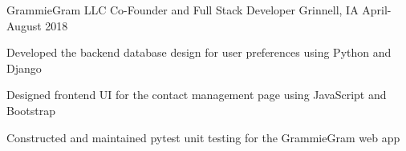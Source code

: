 \documentclass[11pt, a4paper]{awesome-cv}
\begin{document}
\begin{cventries}




  \cventry
    {GrammieGram LLC}
    {Co-Founder and Full Stack Developer}
    {Grinnell, IA}
    {April-August 2018}
    {
      \begin{cvitems}
        \item {Developed the backend database design for user preferences using Python and Django}
        \item {Designed frontend UI for the contact management page using JavaScript and Bootstrap}
        \item {Constructed and maintained pytest unit testing for the GrammieGram web app}
      \end{cvitems}
    }

\end{cventries}
\end{document}
